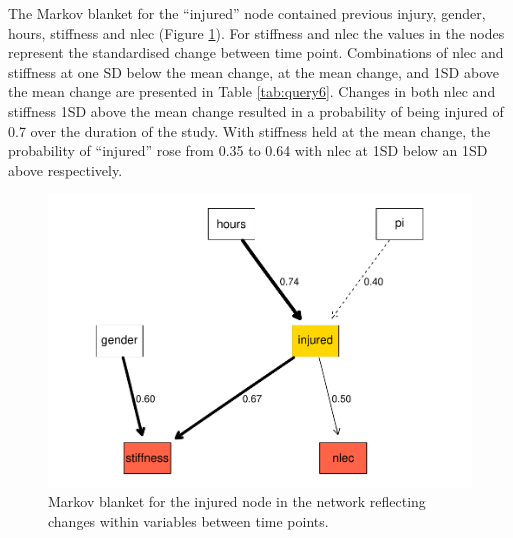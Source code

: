 \documentclass[man,floatsintext]{apa6}
\begin{document}
The Markov blanket for the \enquote{injured} node contained previous injury, gender, hours, stiffness and nlec (Figure \ref{fig:mb3}).
For stiffness and nlec the values in the nodes represent the standardised change between time point.
Combinations of nlec and stiffness at one SD below the mean change, at the mean change, and 1SD above the mean change are presented in Table \ref{tab:query6}.
Changes in both nlec and stiffness 1SD above the mean change resulted in a probability of being injured of 0.7 over the duration of the study.
With stiffness held at the mean change, the probability of \enquote{injured} rose from 0.35 to 0.64 with nlec at 1SD below an 1SD above respectively.

\begin{figure}[H]

{\centering \includegraphics[width=0.9\linewidth]{full_phd_files/figure-latex/mb3-1} 

}

\caption{Markov blanket for the injured node in the network reflecting changes within variables between time points.}\label{fig:mb3}
\end{figure}
\end{document}
